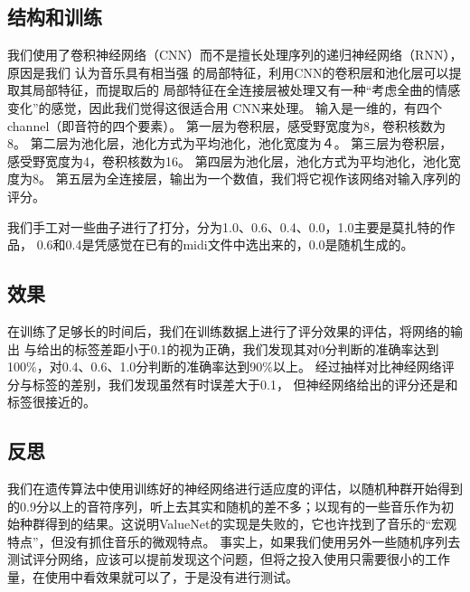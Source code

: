 \documentclass{article}
\begin{document}
  \subsection{结构和训练}
    我们使用了卷积神经网络（CNN）而不是擅长处理序列的递归神经网络（RNN），原因是我们
    认为音乐具有相当强
    的局部特征，利用CNN的卷积层和池化层可以提取其局部特征，而提取后的
    局部特征在全连接层被处理又有一种“考虑全曲的情感变化”的感觉，因此我们觉得这很适合用
    CNN来处理。
    输入是一维的，有四个channel（即音符的四个要素）。
    第一层为卷积层，感受野宽度为8，卷积核数为8。
    第二层为池化层，池化方式为平均池化，池化宽度为４。
    第三层为卷积层，感受野宽度为4，卷积核数为16。
    第四层为池化层，池化方式为平均池化，池化宽度为8。
    第五层为全连接层，输出为一个数值，我们将它视作该网络对输入序列的评分。

    我们手工对一些曲子进行了打分，分为1.0、0.6、0.4、0.0，1.0主要是莫扎特的作品，
    0.6和0.4是凭感觉在已有的midi文件中选出来的，0.0是随机生成的。
  \subsection{效果}
    在训练了足够长的时间后，我们在训练数据上进行了评分效果的评估，将网络的输出
    与给出的标签差距小于0.1的视为正确，我们发现其对0分判断的准确率达到100\%，对0.4、0.6、1.0分判断的准确率达到90\%以上。
    经过抽样对比神经网络评分与标签的差别，我们发现虽然有时误差大于0.1，
    但神经网络给出的评分还是和标签很接近的。
  \subsection{反思}
    我们在遗传算法中使用训练好的神经网络进行适应度的评估，以随机种群开始得到的0.9分以上的音符序列，听上去其实和随机的差不多；以现有的一些音乐作为初始种群得到的结果。这说明ValueNet的实现是失败的，它也许找到了音乐的“宏观特点”，但没有抓住音乐的微观特点。
    事实上，如果我们使用另外一些随机序列去测试评分网络，应该可以提前发现这个问题，但将之投入使用只需要很小的工作量，在使用中看效果就可以了，于是没有进行测试。

\ifx\allfiles\undefined
\end{document}
